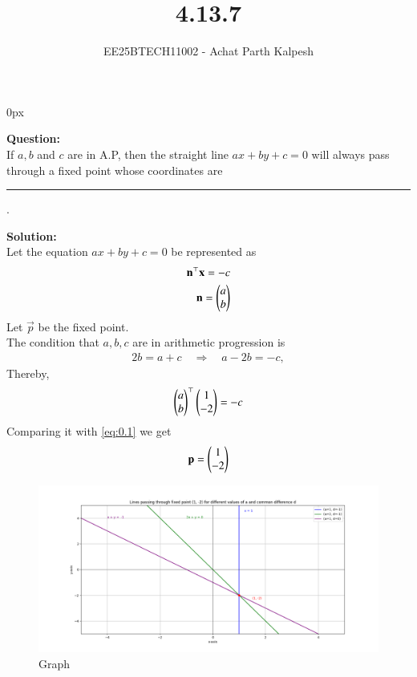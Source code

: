 \documentclass[journal]{IEEEtran}
\begin{document}

\title{4.13.7}
\author{EE25BTECH11002 - Achat Parth Kalpesh }
{\let\newpage\relax\maketitle}
\renewcommand{\thefigure}{\theenumi}
\renewcommand{\thetable}{\theenumi}
\setlength{\intextsep}{10pt} %
\renewcommand{\thetable}{\theenumi}
\parindent 0px



\textbf{Question:}\\
If $a,b$ and $c$ are in A.P, then the straight line $ax +by +c=0$ will always pass through a fixed point whose coordinates are \rule{1cm}{0.01pt}.

\textbf{Solution:}\\
Let the equation $ax +by +c=0$ be represented as
\begin{align}
\label{eq:0.1}
    \mathbf{n}^\top \mathbf{x} = -c\\
    \mathbf{n} = \begin{pmatrix}a\\b\end{pmatrix}
\end{align}
Let $\vec{p}$ be the fixed point.\\
The condition that $a,b,c$ are in arithmetic progression is
\begin{align}
    2b=a+c \quad\Longrightarrow\quad  a - 2b = -c,
    \label{eq:0.3}
\end{align}
Thereby,
\begin{align}
  \begin{pmatrix}a\\b\end{pmatrix}^\top \begin{pmatrix}1\\-2\end{pmatrix} = -c
\end{align}
Comparing it with \eqref{eq:0.1} we get
\begin{align}
    \mathbf{p} = \begin{pmatrix}1\\-2\end{pmatrix}
\end{align}
\begin{figure}[h]
    \centering
    \includegraphics[width=0.9\columnwidth]{figs/figure_py.png}
    \caption{Graph}
    \label{fig:fig}
 \end{figure}
\end{document}
